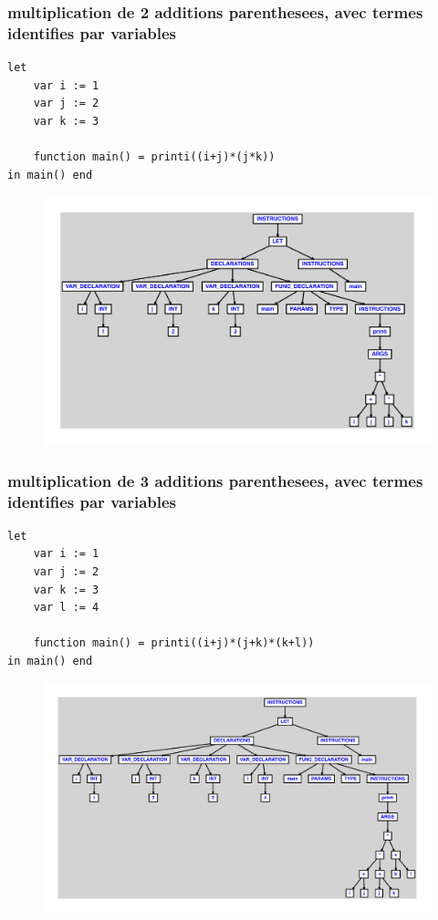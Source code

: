 \documentclass{article}
\begin{document}
\subsubsection{multiplication de 2 additions parenthesees, avec termes identifies par variables}
\begin{lstlisting}
let
	var i := 1
	var j := 2
	var k := 3

	function main() = printi((i+j)*(j*k))
in main() end
\end{lstlisting}
\newpage
\begin{figure}[H]
\centering
\includegraphics[max width=\textwidth]{ast/ast_127.pdf}
\end{figure}
\newpage
\subsubsection{multiplication de 3 additions parenthesees, avec termes identifies par variables}
\begin{lstlisting}
let
	var i := 1
	var j := 2
	var k := 3
	var l := 4

	function main() = printi((i+j)*(j+k)*(k+l))
in main() end
\end{lstlisting}
\newpage
\begin{figure}[H]
\centering
\includegraphics[max width=\textwidth]{ast/ast_128.pdf}
\end{figure}
\newpage
\end{document}
